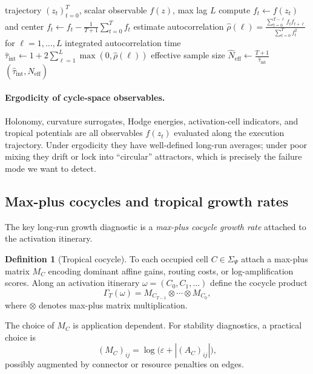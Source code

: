 \documentclass[11pt]{article}
\theoremstyle{definition}
\newtheorem{definition}{Definition}[section]
\theoremstyle{plain}
\theoremstyle{remark}
\begin{document}
\begin{algorithm}[t]
\caption{Ergodic diagnostics for a cyclic subgraph (effective sample size)}
\label{alg:ergodic}
\begin{algorithmic}[1]
\Require trajectory $(z_t)_{t=0}^{T}$, scalar observable $f(z)$, max lag $L$
\State compute $f_t \gets f(z_t)$ and center $f_t \gets f_t - \frac{1}{T+1}\sum_{t=0}^{T} f_t$
\State estimate autocorrelation $\hat\rho(\ell)=\frac{\sum_{t=0}^{T-\ell} f_t f_{t+\ell}}{\sum_{t=0}^{T} f_t^2}$ for $\ell=1,\dots,L$
\State integrated autocorrelation time $\widehat{\tau}_{\mathrm{int}} \gets 1 + 2\sum_{\ell=1}^{L} \max(0,\hat\rho(\ell))$
\State effective sample size $\widehat{N}_{\mathrm{eff}} \gets \frac{T+1}{\widehat{\tau}_{\mathrm{int}}}$
\State \Return $(\widehat{\tau}_{\mathrm{int}}, \widehat{N}_{\mathrm{eff}})$
\end{algorithmic}
\end{algorithm}

\paragraph{Ergodicity of cycle-space observables.}
Holonomy, curvature surrogates, Hodge energies, activation-cell indicators, and tropical potentials are all observables $f(z_t)$ evaluated along the execution trajectory.
Under ergodicity they have well-defined long-run averages; under poor mixing they drift or lock into ``circular'' attractors, which is precisely the failure mode we want to detect.

\subsection{Max-plus cocycles and tropical growth rates}
The key long-run growth diagnostic is a \emph{max-plus cocycle growth rate} attached to the activation itinerary.

\begin{definition}[Tropical cocycle]
To each occupied cell $C\in\Sigma_\Psi$ attach a max-plus matrix $M_C$ encoding dominant affine gains, routing costs, or log-amplification scores.
Along an activation itinerary $\omega=(C_0,C_1,\dots)$ define the cocycle product
\[
\Gamma_T(\omega)=M_{C_{T-1}}\otimes \cdots \otimes M_{C_0},
\]
where $\otimes$ denotes max-plus matrix multiplication.
\end{definition}

The choice of $M_C$ is application dependent.
For stability diagnostics, a practical choice is
\[
(M_C)_{ij}=\log\!\bigl(\varepsilon + |(A_C)_{ij}|\bigr),
\]
possibly augmented by connector or resource penalties on edges.
\end{document}
